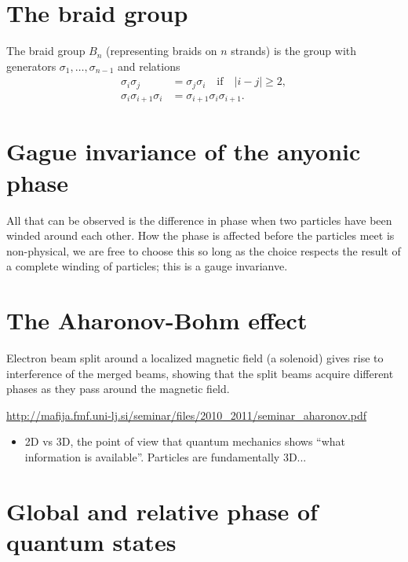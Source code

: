 \documentclass[a4paper,10pt,oneside]{book}
\theoremstyle{plain}
\theoremstyle{definition}
\theoremstyle{remark}
\begin{document}
{\section{The braid group}

The braid group $B_n$ (representing braids on $n$ strands) is the group with generators $\sigma_1, \ldots, \sigma_{n-1}$ and relations
\begin{equation}\label{braid relations}
  \begin{aligned}
    \sigma_i \sigma_j &= \sigma_j \sigma_i \quad\text{if}\quad |i-j| \ge 2, \\
    \sigma_i \sigma_{i+1} \sigma_i &= \sigma_{i+1} \sigma_i \sigma_{i+1}.
  \end{aligned}
\end{equation}

\section{Gague invariance of the anyonic phase}

All that can be observed is the difference in phase when two particles have been winded around each other. How the phase is affected before the particles meet is non-physical, we are free to choose this so long as the choice respects the result of a complete winding of particles; this is a gauge invarianve.


\section{The Aharonov-Bohm effect}

Electron beam split around a localized magnetic field (a solenoid) gives rise to interference of the merged beams, showing that the split beams acquire different phases as they pass around the magnetic field.

\url{http://mafija.fmf.uni-lj.si/seminar/files/2010_2011/seminar_aharonov.pdf}

\begin{itemize}
  \item 2D vs 3D, the point of view that quantum mechanics shows ``what information is available''. Particles are fundamentally 3D...
\end{itemize}


\section{Global and relative phase of quantum states} %

}
\end{document}
